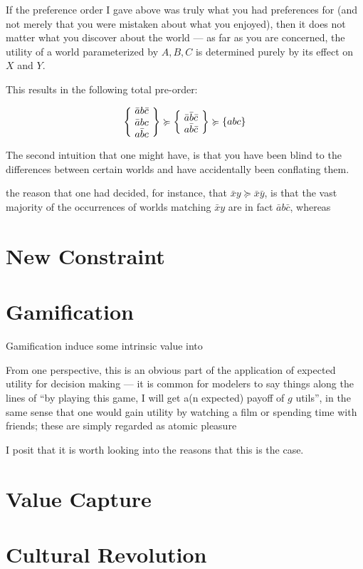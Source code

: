 \documentclass{book}
\newcommand\geqc{\succcurlyeq}
\begin{document}
	If the preference order I gave above was truly what you had preferences for (and not merely that you were mistaken about what you enjoyed), then it does not matter what you discover about the world --- as far as you are concerned, the utility of a world parameterized by $A,B,C$ is determined purely by its effect on $X$ and $Y$. 
	
	This results in the following total pre-order:
	
	\[ \left\{~\parbox[c]{0.5cm}{$\bar a b \bar c$\\$\bar a b c$ \\ $a \bar b c$}~\right\} \geqc \left\{~\parbox[c]{0.5cm}{$\bar a \bar b \bar c$ \\ $a \bar b \bar c$}~\right\} \geqc \left\{abc \right\} \]
	
	The second intuition that one might have, is that you have been blind to the differences between certain worlds and have accidentally been conflating them. 
	
	
	 the reason that one had decided, for instance, that $\bar x y \geqc \bar x \bar y$, is that the vast majority of the occurrences of worlds matching $\bar x y$ are in fact $\bar a b \bar c$, whereas 
	
	
	\section{New Constraint}
	
	\section{Gamification}
	Gamification induce some intrinsic value into 
	
	From one perspective, this is an obvious part of the application of expected utility for decision making --- it is common for modelers to say things along the lines of ``by playing this game, I will get a(n expected) payoff of $g$ utils'', in the same sense that one would gain utility by watching a film or spending time with friends; these are simply regarded as atomic pleasure
	
	I posit that it is worth looking into the reasons that this is the case.
	
	\section{Value Capture}
	
	
	\section{Cultural Revolution}
	
\end{document}
